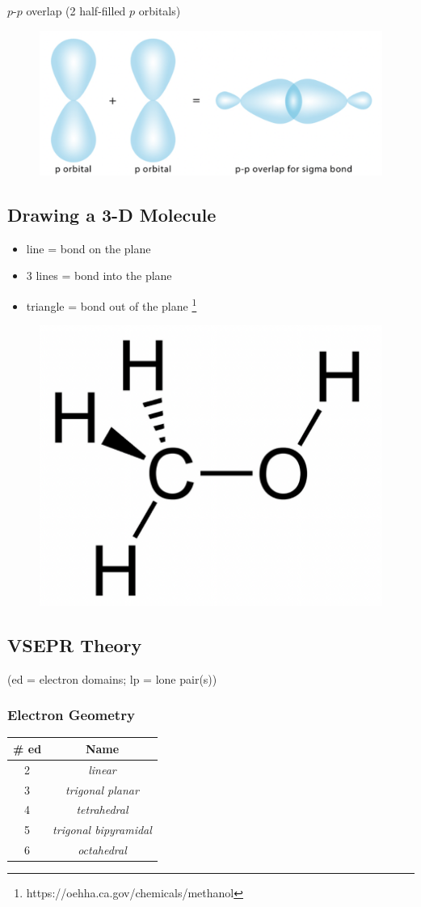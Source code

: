 \documentclass[a4paper, 12pt]{article}
\begin{document}
\begin{center}
    $p$-$p$ overlap (2 half-filled $p$ orbitals)
\end{center}

\begin{figure}[H]
    \centering
    \includegraphics[width=0.45\linewidth]{ppoverlap.png}
    \label{fig:erm}
\end{figure}

\subsection{Drawing a 3-D Molecule}

\begin{itemize}[leftmargin=*, nosep]
    \item line = bond on the plane
    \item 3 lines = bond into the plane
    \item triangle = bond out of the plane \footnote{https://oehha.ca.gov/chemicals/methanol}
\end{itemize}

\begin{figure}[H]
    \centering
    \includegraphics[width=0.3\linewidth]{3dmol.png}
    \label{fig:312456738r902po3iu4}
\end{figure}

\subsection{VSEPR Theory}
(ed = electron domains; lp = lone pair(s))
\subsubsection{Electron Geometry}

\begin{centering}

\begin{tabular}{c|c}
    \textbf{\# ed} & \textbf{Name} \\\hline
    2 & \textit{linear} \\
    3 & \textit{trigonal planar} \\
    4 & \textit{tetrahedral} \\
    5 & \textit{trigonal bipyramidal} \\
    6 & \textit{octahedral}
\end{tabular}

\end{centering}
\end{document}
